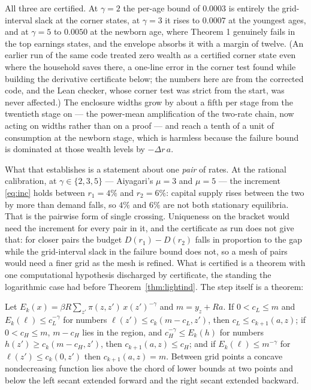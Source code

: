 All three are certified. At $\gamma=2$ the per-age bound of $0.0003$ is entirely the
grid-interval slack at the corner states, at $\gamma=3$ it rises to $0.0007$ at the youngest ages,
and at $\gamma=5$ to $0.0050$ at the newborn age, where Theorem 1 genuinely fails in the top
earnings states, and the envelope absorbs it with a margin of twelve. (An earlier run of the same
code treated zero wealth as a certified corner state even where the household saves there, a
one-line error in the corner test found while building the derivative certificate below; the
numbers here are from the corrected code, and the Lean checker, whose corner test was strict from
the start, was never affected.) The enclosure widths grow by about a fifth per stage from the twentieth stage
on --- the power-mean amplification of the two-rate chain, now acting on widths rather than on a
proof --- and reach a tenth of a unit of consumption at the newborn stage, which is harmless because
the failure bound is dominated at those wealth levels by $-\Delta r\,a$.

What that establishes is a statement about one \emph{pair} of rates. At the rational calibration,
at $\gamma\in\{2,3,5\}$ --- Aiyagari's $\mu=3$ and $\mu=5$ --- the increment \eqref{eq:inc} holds
between $r_1=4\%$ and $r_2=6\%$: capital supply rises between the two by more than demand falls, so
$4\%$ and $6\%$ are not both stationary equilibria. That is the pairwise form of single crossing.
Uniqueness on the bracket would need the increment for every pair in it, and the certificate as run
does not give that: for closer pairs the budget $D(r_1)-D(r_2)$ falls in proportion to the gap while
the grid-interval slack in the failure bound does not, so a mesh of pairs would need a finer grid
as the mesh is refined. What is certified is a theorem with one computational hypothesis discharged
by certificate, the standing the logarithmic case had before Theorem~\ref{thm:lightind}. The step
itself is a theorem:

\begin{theorem}\label{thm:intervaleuler}
Let $E_k(x)=\beta R\sum_{z'}\pi(z,z')\,x(z')^{-\gamma}$ and $m=y_z+Ra$. If $0<c_L\le m$ and
$E_k(\ell)\le c_L^{-\gamma}$ for numbers $\ell(z')\le c_k(m-c_L,z')$, then $c_L\le c_{k+1}(a,z)$; if
$0<c_H\le m$, $m-c_H$ lies in the region, and $c_H^{-\gamma}\le E_k(h)$ for numbers
$h(z')\ge c_k(m-c_H,z')$, then $c_{k+1}(a,z)\le c_H$; and if $E_k(\ell)\le m^{-\gamma}$ for
$\ell(z')\le c_k(0,z')$ then $c_{k+1}(a,z)=m$. Between grid points a concave nondecreasing function
lies above the chord of lower bounds at two points and below the left secant extended forward and
the right secant extended backward.
\end{theorem}

